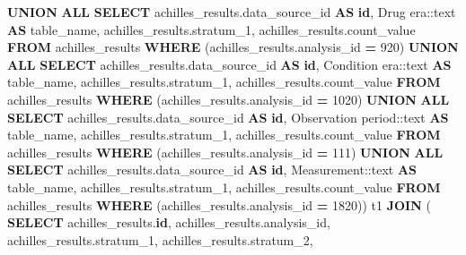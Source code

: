 \documentclass[
]{book}
\newenvironment{Shaded}{\begin{snugshade}}{\end{snugshade}}
\newcommand{\CharTok}[1]{\textcolor[rgb]{0.31,0.60,0.02}{#1}}
\newcommand{\DecValTok}[1]{\textcolor[rgb]{0.00,0.00,0.81}{#1}}
\newcommand{\KeywordTok}[1]{\textcolor[rgb]{0.13,0.29,0.53}{\textbf{#1}}}
\newcommand{\NormalTok}[1]{#1}
\newcommand{\OperatorTok}[1]{\textcolor[rgb]{0.81,0.36,0.00}{\textbf{#1}}}
\newcommand{\StringTok}[1]{\textcolor[rgb]{0.31,0.60,0.02}{#1}}
\begin{document}
\begin{Shaded}
\begin{Highlighting}[]
       \KeywordTok{UNION} \KeywordTok{ALL}
        \KeywordTok{SELECT}\NormalTok{ achilles\_results.data\_source\_id }\KeywordTok{AS} \KeywordTok{id}\NormalTok{,}
           \StringTok{\textquotesingle{}Drug era\textquotesingle{}}\NormalTok{:}\CharTok{:text} \KeywordTok{AS}\NormalTok{ table\_name,}
\NormalTok{           achilles\_results.stratum\_1,}
\NormalTok{           achilles\_results.count\_value}
          \KeywordTok{FROM}\NormalTok{ achilles\_results}
         \KeywordTok{WHERE}\NormalTok{ (achilles\_results.analysis\_id }\OperatorTok{=} \DecValTok{920}\NormalTok{)}
       \KeywordTok{UNION} \KeywordTok{ALL}
        \KeywordTok{SELECT}\NormalTok{ achilles\_results.data\_source\_id }\KeywordTok{AS} \KeywordTok{id}\NormalTok{,}
           \StringTok{\textquotesingle{}Condition era\textquotesingle{}}\NormalTok{:}\CharTok{:text} \KeywordTok{AS}\NormalTok{ table\_name,}
\NormalTok{           achilles\_results.stratum\_1,}
\NormalTok{           achilles\_results.count\_value}
          \KeywordTok{FROM}\NormalTok{ achilles\_results}
         \KeywordTok{WHERE}\NormalTok{ (achilles\_results.analysis\_id }\OperatorTok{=} \DecValTok{1020}\NormalTok{)}
       \KeywordTok{UNION} \KeywordTok{ALL}
        \KeywordTok{SELECT}\NormalTok{ achilles\_results.data\_source\_id }\KeywordTok{AS} \KeywordTok{id}\NormalTok{,}
           \StringTok{\textquotesingle{}Observation period\textquotesingle{}}\NormalTok{:}\CharTok{:text} \KeywordTok{AS}\NormalTok{ table\_name,}
\NormalTok{           achilles\_results.stratum\_1,}
\NormalTok{           achilles\_results.count\_value}
          \KeywordTok{FROM}\NormalTok{ achilles\_results}
         \KeywordTok{WHERE}\NormalTok{ (achilles\_results.analysis\_id }\OperatorTok{=} \DecValTok{111}\NormalTok{)}
       \KeywordTok{UNION} \KeywordTok{ALL}
        \KeywordTok{SELECT}\NormalTok{ achilles\_results.data\_source\_id }\KeywordTok{AS} \KeywordTok{id}\NormalTok{,}
           \StringTok{\textquotesingle{}Measurement\textquotesingle{}}\NormalTok{:}\CharTok{:text} \KeywordTok{AS}\NormalTok{ table\_name,}
\NormalTok{           achilles\_results.stratum\_1,}
\NormalTok{           achilles\_results.count\_value}
          \KeywordTok{FROM}\NormalTok{ achilles\_results}
         \KeywordTok{WHERE}\NormalTok{ (achilles\_results.analysis\_id }\OperatorTok{=} \DecValTok{1820}\NormalTok{)) t1}
    \KeywordTok{JOIN}\NormalTok{ ( }\KeywordTok{SELECT}\NormalTok{ achilles\_results.}\KeywordTok{id}\NormalTok{,}
\NormalTok{           achilles\_results.analysis\_id,}
\NormalTok{           achilles\_results.stratum\_1,}
\NormalTok{           achilles\_results.stratum\_2,}

\end{Highlighting}
\end{Shaded}
\end{document}
